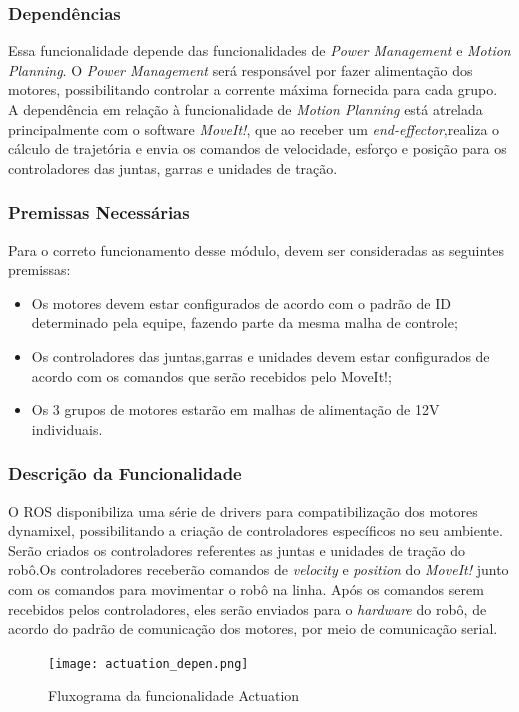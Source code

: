 \subsubsection{Dependências}
Essa funcionalidade depende das funcionalidades de \textit{Power Management} e \textit{Motion Planning}. O \textit{Power Management} será responsável por fazer alimentação dos motores, possibilitando controlar a corrente máxima fornecida para cada grupo.
A dependência em relação à funcionalidade de \textit{Motion Planning} está atrelada principalmente com o software \textit{MoveIt!}, que ao receber um \textit{end-effector},realiza o cálculo de trajetória e envia os comandos de velocidade, esforço e posição para os controladores das juntas, garras e unidades de tração.

\subsubsection{Premissas Necessárias}
Para o correto funcionamento desse módulo, devem ser consideradas as seguintes premissas:
\begin{itemize}
	\item Os motores devem estar configurados de acordo com o padrão de ID determinado pela equipe, fazendo parte da mesma malha de controle;
	\item Os controladores das juntas,garras e unidades devem estar configurados de acordo com os comandos que serão recebidos pelo MoveIt!;
	\item Os 3 grupos de motores estarão em malhas de alimentação de 12V individuais.
\end{itemize}
\subsubsection{Descrição da Funcionalidade}
O ROS disponibiliza uma série de drivers para compatibilização dos motores dynamixel, possibilitando a criação de controladores específicos no seu ambiente. Serão criados os controladores referentes as juntas e unidades de tração do robô.Os controladores receberão comandos de \textit{velocity} e \textit{position} do \textit{MoveIt!} junto com os comandos para movimentar o robô na linha.
Após os comandos serem recebidos pelos controladores, eles serão enviados para o \textit{hardware} do robô, de acordo do padrão de comunicação dos motores, por meio de comunicação serial. 
\begin{figure}[h]
	\centering
	\texttt{[image: actuation\_depen.png]}
	\caption{Fluxograma da funcionalidade Actuation}
	\label{fig:depen_actuation}
\end{figure}
